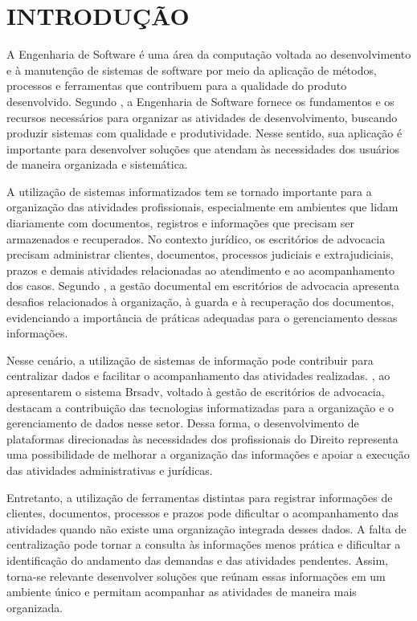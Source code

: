 %
\setcounter{page}{6}
\chapter{INTRODUÇÃO}\label{chap:introducao}
A Engenharia de Software é uma área da computação voltada ao desenvolvimento e à manutenção de sistemas de software por meio da aplicação de métodos, processos e ferramentas que contribuem para a qualidade do produto desenvolvido. Segundo , a Engenharia de Software fornece os fundamentos e os recursos necessários para organizar as atividades de desenvolvimento, buscando produzir sistemas com qualidade e produtividade. Nesse sentido, sua aplicação é importante para desenvolver soluções que atendam às necessidades dos usuários de maneira organizada e sistemática.

A utilização de sistemas informatizados tem se tornado importante para a organização das atividades profissionais, especialmente em ambientes que lidam diariamente com documentos, registros e informações que precisam ser armazenados e recuperados. No contexto jurídico, os escritórios de advocacia precisam administrar clientes, documentos, processos judiciais e extrajudiciais, prazos e demais atividades relacionadas ao atendimento e ao acompanhamento dos casos. Segundo , a gestão documental em escritórios de advocacia apresenta desafios relacionados à organização, à guarda e à recuperação dos documentos, evidenciando a importância de práticas adequadas para o gerenciamento dessas informações.

Nesse cenário, a utilização de sistemas de informação pode contribuir para centralizar dados e facilitar o acompanhamento das atividades realizadas. , ao apresentarem o sistema Brsadv, voltado à gestão de escritórios de advocacia, destacam a contribuição das tecnologias informatizadas para a organização e o gerenciamento de dados nesse setor. Dessa forma, o desenvolvimento de plataformas direcionadas às necessidades dos profissionais do Direito representa uma possibilidade de melhorar a organização das informações e apoiar a execução das atividades administrativas e jurídicas.

Entretanto, a utilização de ferramentas distintas para registrar informações de clientes, documentos, processos e prazos pode dificultar o acompanhamento das atividades quando não existe uma organização integrada desses dados. A falta de centralização pode tornar a consulta às informações menos prática e dificultar a identificação do andamento das demandas e das atividades pendentes. Assim, torna-se relevante desenvolver soluções que reúnam essas informações em um ambiente único e permitam acompanhar as atividades de maneira mais organizada.

